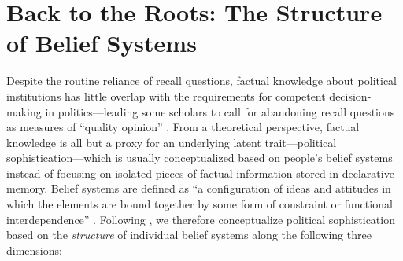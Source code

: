 \section*{Back to the Roots: The Structure of Belief Systems}



Despite the routine reliance of recall questions, factual knowledge about political institutions has little overlap with the requirements for competent decision-making in politics---leading some scholars to call for abandoning recall questions as measures of ``quality opinion'' \citep{druckman2014pathologies}. From a theoretical perspective, factual knowledge is all but a proxy for an underlying latent trait---political sophistication---which is usually conceptualized based on people's belief systems instead of focusing on isolated pieces of factual information stored in declarative memory. Belief systems are defined as ``a configuration of ideas and attitudes in which the elements are bound together by some form of constraint or functional interdependence'' \citep[207]{converse1964nature}. Following \citet{luskin1987measuring}, we therefore conceptualize political sophistication based on the \textit{structure} of individual belief systems along the following three dimensions:


